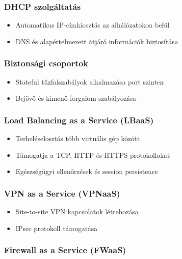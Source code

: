 \documentclass[a4paper,12pt]{article}
\begin{document}
    \subsubsection{DHCP szolgáltatás}

    \begin{itemize}
        \item Automatikus IP-címkiosztás az alhálózatokon belül
        \item DNS és alapértelmezett átjáró információk biztosítása
    \end{itemize}

    \subsubsection{Biztonsági csoportok}

    \begin{itemize}
        \item Stateful tűzfalszabályok alkalmazása port szinten
        \item Bejövő és kimenő forgalom szabályozása
    \end{itemize}

    \subsubsection{Load Balancing as a Service (LBaaS)}

    \begin{itemize}
        \item Terheléselosztás több virtuális gép között
        \item Támogatja a TCP, HTTP és HTTPS protokollokat
        \item Egészségügyi ellenőrzések és session persistence
    \end{itemize}

    \subsubsection{VPN as a Service (VPNaaS)}

    \begin{itemize}
        \item Site-to-site VPN kapcsolatok létrehozása
        \item IPsec protokoll támogatása
    \end{itemize}

    \subsubsection{Firewall as a Service (FWaaS)}
\end{document}

